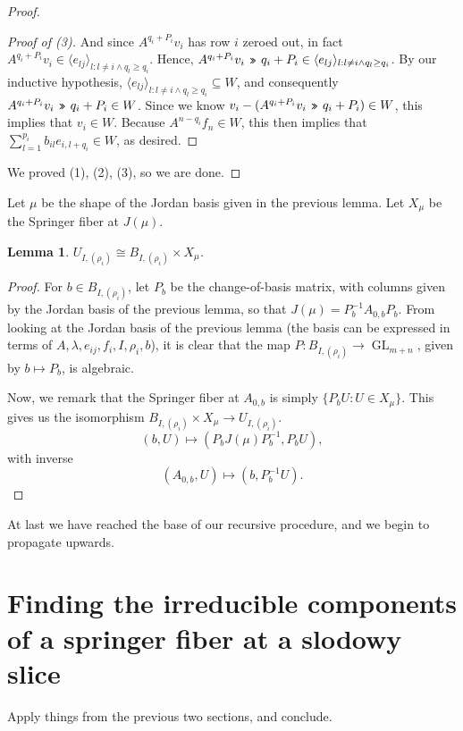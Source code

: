 \documentclass[12pt,psamsfonts]{article}
\newcommand{\leftshift}{\,\texttt{<<}\,}
\newcommand{\rightshift}{\mathbin{\rotatebox[origin=c]{180}{\leftshift}}}
\DeclareMathOperator{\GL}{GL}
\newtheorem{lemma}[theorem]{Lemma}
\begin{document}
\begin{proof}
\begin{proof}[Proof of (3)]
        And since \(A^{q_i + P_i} v_i\) has row \(i\) zeroed out, in fact \(A^{q_i + P_i} v_i \in \langle e_{lj} \rangle_{l : l \neq i \land q_l \geq q_i}\).
        Hence, \(A^{q_i + P_i} v_i \rightshift q_i + P_i \in \langle e_{lj} \rangle_{l : l \neq i \land q_l \geq q_i}\).
        By our inductive hypothesis, \(\langle e_{lj} \rangle_{l : l \neq i \land q_l \geq q_i} \subseteq W\), and consequently \(A^{q_i + P_i} v_i \rightshift q_i + P_i \in W\).
        Since we know \(v_i - (A^{q_i + P_i} v_i \rightshift q_i + P_i) \in W\), this implies that \(v_i \in W\).
        Because \(A^{n - q_i} f_n \in W\), this then implies that \(\sum_{l = 1}^{p_i} b_{il} e_{i,l + q_i} \in W\), as desired.
    \end{proof}
    We proved (1), (2), (3), so we are done.
\end{proof}

Let \(\mu\) be the shape of the Jordan basis given in the previous lemma.
Let \(X_\mu\) be the Springer fiber at \(J(\mu)\).

\begin{lemma}
    \(U_{I, (\rho_i)} \cong B_{I, (\rho_i)} \times X_\mu\).
\end{lemma}
\begin{proof}
    For \(b \in B_{I, (\rho_i)}\), let \(P_b\) be the change-of-basis matrix, with columns given by the Jordan basis of the previous lemma, so that \(J(\mu) = P_b^{-1} A_{0,b} P_b\).
    From looking at the Jordan basis of the previous lemma (the basis can be expressed in terms of \(A, \lambda, e_{ij}, f_i, I, \rho_i, b\)), it is clear that the map \(P : B_{I, (\rho_i)} \to \GL_{m + n}\), given by \(b \mapsto P_b\), is algebraic.
    \par Now, we remark that the Springer fiber at \(A_{0,b}\) is simply \(\{P_b U : U \in X_\mu\}\).
    This gives us the isomorphism \(B_{I, (\rho_i)} \times X_\mu \to U_{I, (\rho_i)}\).
    \[(b, U) \mapsto (P_b J(\mu) P_b^{-1}, P_b U),\]
    with inverse
    \[(A_{0,b}, U) \mapsto (b, P_b^{-1} U).\]
\end{proof}
At last we have reached the base of our recursive procedure, and we begin to propagate upwards.

\section{Finding the irreducible components of a springer fiber at a slodowy slice}
Apply things from the previous two sections, and conclude.
\end{document}
